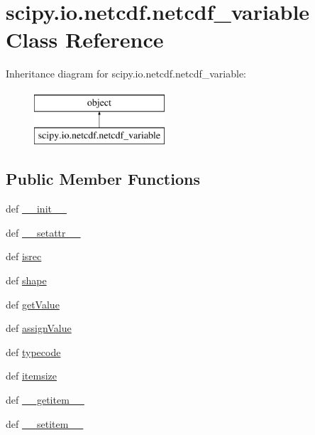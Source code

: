 \hypertarget{classscipy_1_1io_1_1netcdf_1_1netcdf__variable}{}\section{scipy.\+io.\+netcdf.\+netcdf\+\_\+variable Class Reference}
\label{classscipy_1_1io_1_1netcdf_1_1netcdf__variable}
Inheritance diagram for scipy.\+io.\+netcdf.\+netcdf\+\_\+variable\+:\begin{figure}[H]
\begin{center}
\leavevmode
\includegraphics[height=2.000000cm]{classscipy_1_1io_1_1netcdf_1_1netcdf__variable}
\end{center}
\end{figure}
\subsection*{Public Member Functions}
\begin{DoxyCompactItemize}
\item 
def \hyperlink{classscipy_1_1io_1_1netcdf_1_1netcdf__variable_a604e1e2f3b6dccc7ef97bbd55afc63fc}{\+\_\+\+\_\+init\+\_\+\+\_\+}
\item 
def \hyperlink{classscipy_1_1io_1_1netcdf_1_1netcdf__variable_ae2839de88e2d1a1f433aa6c22f0a56eb}{\+\_\+\+\_\+setattr\+\_\+\+\_\+}
\item 
def \hyperlink{classscipy_1_1io_1_1netcdf_1_1netcdf__variable_a3b36b098ec8253bedbd82810198cb253}{isrec}
\item 
def \hyperlink{classscipy_1_1io_1_1netcdf_1_1netcdf__variable_aca210ea4bfbe89ca4c0e45e4950ea463}{shape}
\item 
def \hyperlink{classscipy_1_1io_1_1netcdf_1_1netcdf__variable_a741b07aa02c5e8c084219b27f7e59bc3}{get\+Value}
\item 
def \hyperlink{classscipy_1_1io_1_1netcdf_1_1netcdf__variable_a198a1a4714cfbe3e16e11c2eee8cddd3}{assign\+Value}
\item 
def \hyperlink{classscipy_1_1io_1_1netcdf_1_1netcdf__variable_a19104e4ac250b0d63e580f73a6442094}{typecode}
\item 
def \hyperlink{classscipy_1_1io_1_1netcdf_1_1netcdf__variable_a6e514b6be6e5282bacc76bfbf0f1e581}{itemsize}
\item 
def \hyperlink{classscipy_1_1io_1_1netcdf_1_1netcdf__variable_a921e551b1e2fdb4cfb3421edcc813193}{\+\_\+\+\_\+getitem\+\_\+\+\_\+}
\item 
def \hyperlink{classscipy_1_1io_1_1netcdf_1_1netcdf__variable_abd36d0f04fafdf0bcd9005dbecc9c12a}{\+\_\+\+\_\+setitem\+\_\+\+\_\+}
\end{DoxyCompactItemize}
